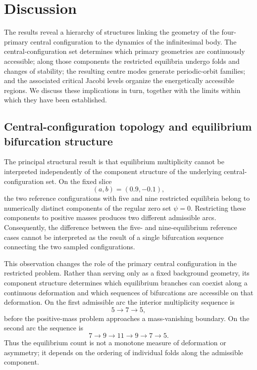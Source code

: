 \section{Discussion}
\label{sec:discussion}

The results reveal a hierarchy of structures linking the geometry of the
four-primary central configuration to the dynamics of the infinitesimal
body. The central-configuration set determines which primary geometries are
continuously accessible; along those components the restricted equilibria
undergo folds and changes of stability; the resulting centre modes generate
periodic-orbit families; and the associated critical Jacobi levels organize
the energetically accessible regions. We discuss these implications in
turn, together with the limits within which they have been established.


\subsection{Central-configuration topology and equilibrium bifurcation structure}
\label{subsec:discussion_cc}

The principal structural result is that equilibrium multiplicity cannot be
interpreted independently of the component structure of the underlying
central-configuration set. On the fixed slice
\[
(a,b)=(0.9,-0.1),
\]
the two reference configurations with five and nine restricted equilibria
belong to numerically distinct components of the regular zero set
$\psi=0$. Restricting these components to positive masses produces two
different admissible arcs. Consequently, the difference between the
five- and nine-equilibrium reference cases cannot be interpreted as the
result of a single bifurcation sequence connecting the two sampled
configurations.

This observation changes the role of the primary central configuration in
the restricted problem. Rather than serving only as a fixed background
geometry, its component structure determines which equilibrium branches
can coexist along a continuous deformation and which sequences of
bifurcations are accessible on that deformation. On the first admissible
arc the interior multiplicity sequence is
\[
5\rightarrow7\rightarrow5,
\]
before the positive-mass problem approaches a mass-vanishing boundary. On
the second arc the sequence is
\[
7\rightarrow9\rightarrow11\rightarrow9\rightarrow7\rightarrow5.
\]
Thus the equilibrium count is not a monotone measure of deformation or
asymmetry; it depends on the ordering of individual folds along the
admissible component.

